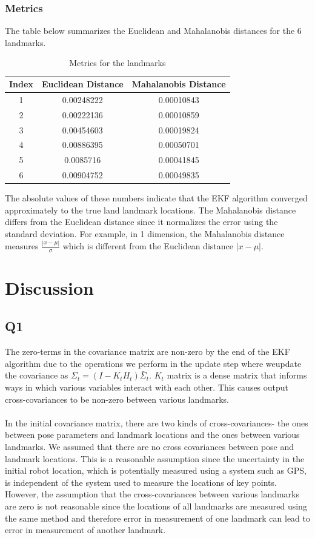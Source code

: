 \documentclass[12pt, a4paper]{article}
\begin{document}
\subsubsection{Metrics}
The table below summarizes the Euclidean and Mahalanobis distances for the 6 landmarks.
\begin{table}[H]
  \centering
  \begin{tabular}{|c|c|c|}
  \hline
  \textbf{Index} & \textbf{Euclidean Distance} & \textbf{Mahalanobis Distance} \\
  \hline
  1 & 0.00248222 & 0.00010843 \\
  2 & 0.00222136 & 0.00010859 \\
  3 & 0.00454603 & 0.00019824 \\
  4 & 0.00886395 & 0.00050701 \\
  5 & 0.0085716 & 0.00041845 \\
  6 & 0.00904752 & 0.00049835 \\
  \hline
  \end{tabular}
  \caption{Metrics for the landmarks}
  \end{table}
\noindent The absolute values of these numbers indicate that the EKF algorithm converged approximately to the true land landmark locations. The Mahalanobis distance differs from the Euclidean distance since it normalizes the error using the standard deviation. For example, in 1 dimension, the Mahalanobis distance measures $\frac{|x - \mu|}{\sigma}$ which is different from the Euclidean distance $|x - \mu|$.
\section{Discussion}
\subsection{Q1}
The zero-terms in the covariance matrix are non-zero by the end of the EKF algorithm due to the operations we perform in the update step where weupdate the covariance as $\Sigma_t = (I-K_tH_t)\bar{\Sigma}_t$. $K_t$ matrix is a dense matrix that informs ways in which various variables interact with each other. This causes output cross-covariances to be non-zero between various landmarks.\\\\
In the initial covariance matrix, there are two kinds of cross-covariances- the ones between pose parameters and landmark locations and the ones between various landmarks. We assumed that there are no cross covariances between pose and landmark locations. This is a reasonable assumption since the uncertainty in the initial robot location, which is potentially measured using a system such as GPS, is independent of the system used to measure the locations of key points. However, the assumption that the cross-covariances between various landmarks are zero is not reasonable since the locations of all landmarks are measured using the same method and therefore error in measurement of one landmark can lead to error in measurement of another landmark.
\end{document}
